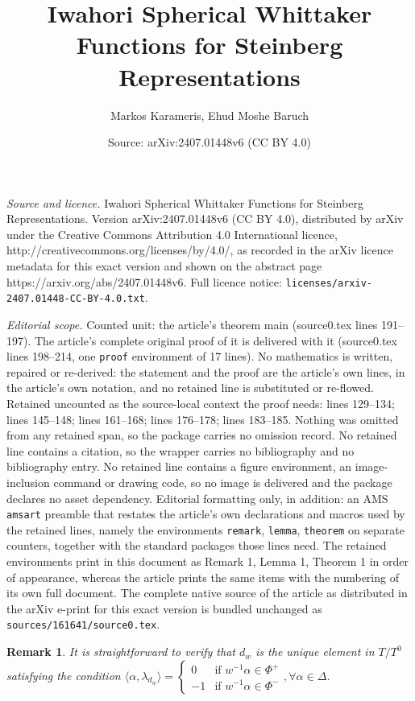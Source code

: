 \documentclass[10pt,a4paper]{amsart}
\title{Iwahori Spherical Whittaker Functions for Steinberg Representations}
\author{Markos Karameris, Ehud Moshe Baruch}
\date{Source: arXiv:2407.01448v6 (CC BY 4.0)}
\newtheorem{remark}{Remark}
\begin{document}
\maketitle

\noindent\emph{Source and licence.} Iwahori Spherical Whittaker Functions for Steinberg Representations. Version arXiv:2407.01448v6 (CC BY 4.0), distributed by arXiv under the Creative Commons Attribution 4.0 International licence, http://creativecommons.org/licenses/by/4.0/, as recorded in the arXiv licence metadata for this exact version and shown on the abstract page https://arxiv.org/abs/2407.01448v6. Full licence notice: \texttt{licenses/arxiv-2407.01448-CC-BY-4.0.txt}.\par\smallskip

\noindent\textit{Editorial scope.} Counted unit: the article's theorem main (source0.tex lines 191--197). The article's complete original proof of it is delivered with it (source0.tex lines 198--214, one \texttt{proof} environment of 17 lines). No mathematics is written, repaired or re-derived: the statement and the proof are the article's own lines, in the article's own notation, and no retained line is substituted or re-flowed.  Retained uncounted as the source-local context the proof needs: lines 129--134; lines 145--148; lines 161--168; lines 176--178; lines 183--185.  Nothing was omitted from any retained span, so the package carries no omission record.  No retained line contains a citation, so the wrapper carries no bibliography and no bibliography entry.  No retained line contains a figure environment, an image-inclusion command or drawing code, so no image is delivered and the package declares no asset dependency.  Editorial formatting only, in addition: an AMS \texttt{amsart} preamble that restates the article's own declarations and macros used by the retained lines, namely the environments \texttt{remark}, \texttt{lemma}, \texttt{theorem} on separate counters, together with the standard packages those lines need.  The retained environments print in this document as Remark 1, Lemma 1, Theorem 1 in order of appearance, whereas the article prints the same items with the numbering of its own full document.  The complete native source of the article as distributed in the arXiv e-print for this exact version is bundled unchanged as \texttt{sources/161641/source0.tex}.
\begin{remark} \label{domd} It is straightforward to verify that $d_w$ is the unique element in $T/T^0$ satisfying the condition
 $\langle\alpha,\lambda_{d_w}\rangle= \begin{cases}
        0 & \text{if $w^{-1}\alpha\in \Phi^+$} \\
        -1 & \text{if $w^{-1}\alpha\in \Phi^-$} 
    \end{cases},\forall\alpha\in\Delta$.
\end{remark}
\end{document}

